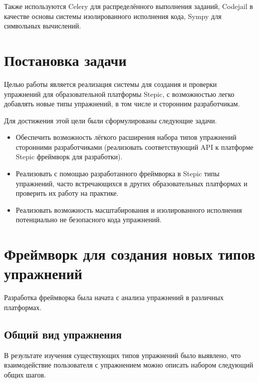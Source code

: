 \documentclass{matmex-diploma-custom}
\begin{document}
Также используются Celery для распределённого выполнения заданий,
Codejail в качестве основы системы изолированного исполнения кода,
Sympy для символьных вычислений.

\section{Постановка задачи}
Целью работы является реализация системы для создания и проверки
упражнений для образовательной платформы Stepic, с возможностью легко
добавлять новые типы упражнений, в том числе и сторонним
разработчикам.

Для достижения этой цели были сформулированы следующие задачи.

\begin{itemize}
\item Обеспечить возможность лёгкого расширения набора типов
  упражнений сторонними разработчиками (реализовать соответствующий
  API к платформе Stepic фреймворк для разработки).
\item Реализовать с помощью разработанного фреймворка в Stepic типы
  упражнений, часто встречающихся в других образовательных платформах
  и проверить их работу на практике.
\item Реализовать возможность масштабирования и изолированного
  исполнения потенциально не безопасного кода упражнений.
\end{itemize}

\section{Фреймворк для создания новых типов упражнений}
Разработка фреймворка была начата с анализа упражнений в различных
платформах.

\subsection{Общий вид упражнения}
В результате изучения существующих типов упражнений было
выявлено, что взаимодействие пользователя с упражнением можно описать
набором следующий общих шагов.
\end{document}
